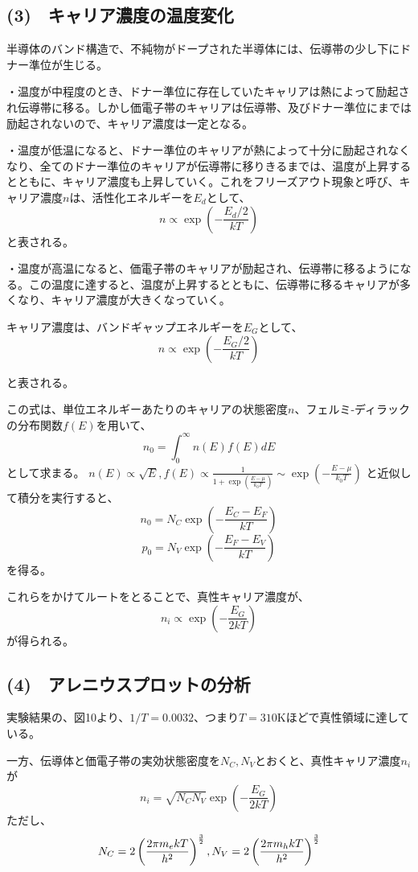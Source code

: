 \documentclass[dvipdfmx]{jsarticle}
\begin{document}
\subsection*{(3)　キャリア濃度の温度変化}
半導体のバンド構造で、不純物がドープされた半導体には、伝導帯の少し下にドナー準位が生じる。

・温度が中程度のとき、ドナー準位に存在していたキャリアは熱によって励起され伝導帯に移る。しかし価電子帯のキャリアは伝導帯、及びドナー準位にまでは励起されないので、キャリア濃度は一定となる。

・温度が低温になると、ドナー準位のキャリアが熱によって十分に励起されなくなり、全てのドナー準位のキャリアが伝導帯に移りきるまでは、温度が上昇するとともに、キャリア濃度も上昇していく。これをフリーズアウト現象と呼び、キャリア濃度$n$は、活性化エネルギーを$E_{d}$として、
\[n \propto \exp{(-\frac{E_{d}/2}{kT})}\]
と表される。

・温度が高温になると、価電子帯のキャリアが励起され、伝導帯に移るようになる。この温度に達すると、温度が上昇するとともに、伝導帯に移るキャリアが多くなり、キャリア濃度が大きくなっていく。

キャリア濃度は、バンドギャップエネルギーを$E_{G}$として、
\[n \propto \exp{(-\frac{E_{G}/2}{kT})}\]

と表される。

この式は、単位エネルギーあたりのキャリアの状態密度$n$、フェルミ-ディラックの分布関数$f(E)$を用いて、
\[n_{0} = \int _{0} ^{\infty} n(E)f(E)dE\]
として求まる。
$n(E) \propto \sqrt{E}, f(E) \propto \frac{1}{1+\exp{\left(\frac{E-\mu}{k_{0}T}\right)}} \sim \exp{\left(-\frac{E-\mu}{k_{0}T}\right)}$
と近似して積分を実行すると、
\[n_{0} = N_{C}\exp{\left(-\frac{E_{C}-E_{F}}{kT}\right)}\]
\[p_{0} = N_{V}\exp{\left(-\frac{E_{F}-E_{V}}{kT}\right)}\]
を得る。

これらをかけてルートをとることで、真性キャリア濃度が、
\[n_{i} \propto \exp{\left(-\frac{E_{G}}{2kT}\right)}\]
が得られる。
\subsection*{(4)　アレニウスプロットの分析}
実験結果の、図10より、$1/T = 0.0032$、つまり$T = 310$Kほどで真性領域に達している。

一方、伝導体と価電子帯の実効状態密度を$N_{C}, N_{V}$とおくと、真性キャリア濃度$n_{i}$が
\begin{equation}
n_{i} = \sqrt{N_{C}N_{V}}\exp{\left(-\frac{E_{G}}{2kT}\right)}
\end{equation}
ただし、
\begin{equation}
N_{C} = 2\left(\frac{2\pi m_{e}kT}{h^{2}}\right)^{\frac{3}{2}}\\
, N_{V} = 2\left(\frac{2\pi m_{h}kT}{h^{2}}\right)^{\frac{3}{2}}
\end{equation}
\end{document}
